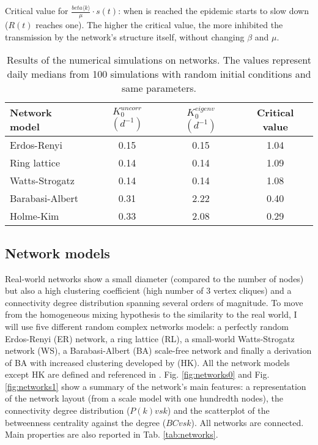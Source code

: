 \documentclass[DIV=12, BCOR=0pt]{scrartcl}  %
\begin{document}
	Critical value for $\frac{beta \langle k \rangle}{\mu} \cdot s(t)$: when is reached the epidemic starts to slow down ($R(t)$ reaches one). The higher the critical value, the more inhibited the transmission by the network's structure itself, without changing $\beta$ and $\mu$.
	
	
	\begin{table}[h]
		\centering
		\caption{Results of the numerical simulations on networks. The values represent daily medians from 100 simulations with random initial conditions and same parameters.}
		\label{tab:dbmfa}
		\begin{tabular}{lccc}
			\toprule
			Network model & $K_0^{uncorr}$ $(d^{-1})$ & $K_0^{eigenv}$ $(d^{-1})$ & Critical value \\
			\midrule 
			 Erdos-Renyi 			& 	 0.15 &   0.15 &  1.04  \\
			 Ring lattice 		&    0.14 &   0.14 &  1.09  \\
			 Watts-Strogatz 	&    0.14 &   0.14 &  1.08  \\
			 Barabasi-Albert 	&    0.31 &   2.22 &  0.40  \\
			 Holme-Kim 				&    0.33 &   2.08 &  0.29  \\
			\bottomrule
	  \end{tabular}
	\end{table}

  \subsection{Network models}
  Real-world networks show a small diameter (compared to the number of nodes) but also a high clustering coefficient (high number of 3 vertex cliques) and a connectivity degree distribution spanning several orders of magnitude.
  To move from the homogeneous mixing hypothesis to the similarity to the real world, I will use five different random complex networks models: a perfectly random Erdos-Renyi (ER) network, a ring lattice (RL), a small-world Watts-Strogatz network (WS), a Barabasi-Albert (BA) scale-free network and finally a derivation of BA with increased clustering developed by \citet{Holme} (HK). All the network models except HK are defined and referenced in \citet{PastorSatorras}. 
  Fig. \ref{fig:networks0} and Fig. \ref{fig:networks1} show a summary of the network's main features: a representation of the network layout (from a scale model with one hundredth nodes), the connectivity degree distribution ($P(k) vs k$) and the scatterplot of the betweenness centrality against the degree ($BC vs k$). All networks are connected. Main properties are also reported in Tab. \ref{tab:networks}.
  
\end{document}
